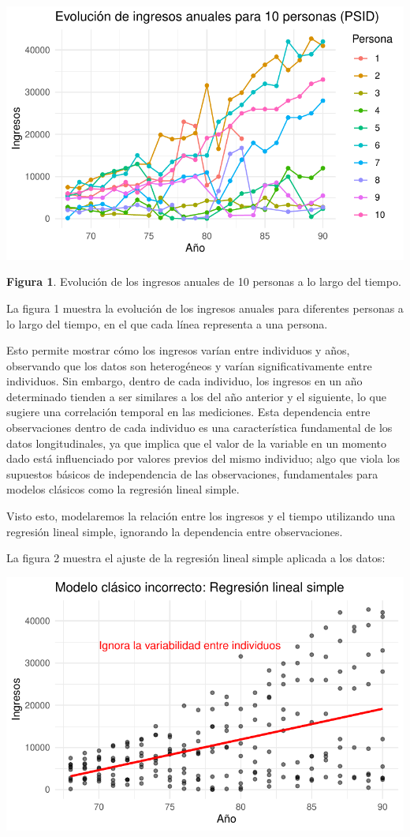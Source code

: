 \documentclass[
  letterpaper,
  DIV=11,
  numbers=noendperiod]{scrreprt}
\begin{document}
\includegraphics{cap2_files/figure-pdf/unnamed-chunk-1-1.pdf}

\textbf{Figura 1}. Evolución de los ingresos anuales de 10 personas a lo
largo del tiempo.

La figura 1 muestra la evolución de los ingresos anuales para diferentes
personas a lo largo del tiempo, en el que cada línea representa a una
persona.

Esto permite mostrar cómo los ingresos varían entre individuos y años,
observando que los datos son heterogéneos y varían significativamente
entre individuos. Sin embargo, dentro de cada individuo, los ingresos en
un año determinado tienden a ser similares a los del año anterior y el
siguiente, lo que sugiere una correlación temporal en las mediciones.
Esta dependencia entre observaciones dentro de cada individuo es una
característica fundamental de los datos longitudinales, ya que implica
que el valor de la variable en un momento dado está influenciado por
valores previos del mismo individuo; algo que viola los supuestos
básicos de independencia de las observaciones, fundamentales para
modelos clásicos como la regresión lineal simple.

Visto esto, modelaremos la relación entre los ingresos y el tiempo
utilizando una regresión lineal simple, ignorando la dependencia entre
observaciones.

La figura 2 muestra el ajuste de la regresión lineal simple aplicada a
los datos:

\includegraphics{cap2_files/figure-pdf/unnamed-chunk-3-1.pdf}
\end{document}
